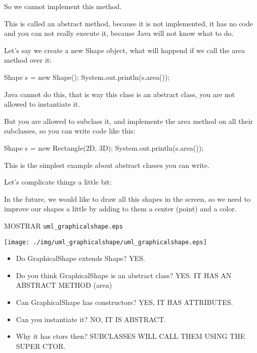 \documentclass[a4paper, 9pt]{extarticle}
\begin{document}
So we cannot implement this method.

This is called an abstract method, because it is not implemented, it has no
code and you can not really execute it, because Java will not know what to do.


Let's say we create a new Shape object, what will happend if we call the area method over it:

\begin{blackboard}
  Shape s = new Shape();
  System.out.println(s.area());
\end{blackboard}

Java cannot do this, that is way this class is an abstract class, you are not
allowed to instantiate it.

But you are allowed to subclass it, and implemente the area method on all their subclasses, so you can write code like this:

\begin{blackboard}
  Shape s = new Rectangle(2D, 3D);
  System.out.println(s.area());
\end{blackboard}



This is the simplest example about abstract classes you can write.

Let's complicate things a little bit:

In the future, we would like to draw all this shapes in the screen, so we need
to improve our shapes a little by adding to them a center (point) and a color.

MOSTRAR \verb+uml_graphicalshape.eps+
\begin{center}
  \texttt{[image: ./img/uml\_graphicalshape/uml\_graphicalshape.eps]}
\end{center}

\begin{itemize}

  \item Do GraphicalShape extends Shape? YES.

  \item Do you think GraphicalShape is an abstract class? YES. IT HAS AN ABSTRACT METHOD (area)

  \item Can GraphicalShape has constructors? YES, IT HAS ATTRIBUTES.

  \item Can you instantiate it? NO, IT IS ABSTRACT.

  \item Why it has ctors then? SUBCLASSES WILL CALL THEM USING THE SUPER CTOR.

\end{itemize}
\end{document}
